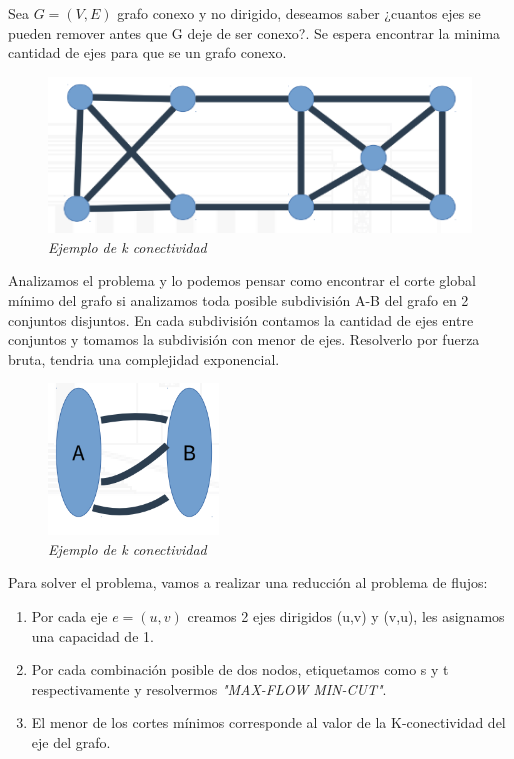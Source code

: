 \documentclass{article}
\begin{document}
Sea \(G=(V,E)\) grafo conexo y no dirigido, deseamos saber ¿cuantos ejes se pueden remover antes 
que G deje de ser conexo?. Se espera encontrar la minima cantidad de ejes para que se un grafo conexo.

\begin{figure}[h!]
    \begin{center} 
    \includegraphics[scale=0.5]{imagenes/ejemplo-k-conectividad.png}
    \caption{\small \sl Ejemplo de k conectividad} 
    \end{center}
\end{figure}

Analizamos el problema y lo podemos pensar como encontrar el corte global mínimo del grafo si
analizamos toda posible subdivisión A-B del grafo en 2 conjuntos disjuntos. En cada 
subdivisión contamos la cantidad de ejes entre conjuntos y tomamos la subdivisión con menor 
de ejes. Resolverlo por fuerza bruta, tendria una complejidad exponencial.

\begin{figure}[h!]
    \begin{center} 
    \includegraphics[scale=0.5]{imagenes/ejemplo-subdivicion.png}
    \caption{\small \sl Ejemplo de k conectividad} 
    \end{center}
\end{figure}

Para solver el problema, vamos a realizar una reducción al problema de flujos:

\begin{enumerate}
    \item Por cada eje \(e=(u,v)\) creamos 2 ejes dirigidos (u,v) y (v,u), les asignamos una capacidad de 1.
    \item Por cada combinación posible de dos nodos, etiquetamos como s y t respectivamente y resolvermos \textit{"MAX-FLOW MIN-CUT"}.
    \item El menor de los cortes mínimos corresponde al valor de la K-conectividad del eje del grafo.
\end{enumerate}
\end{document}
